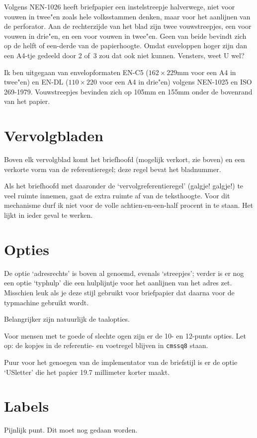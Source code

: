 \documentclass[a4paper,10pt]{artikel1}
\begin{document}
Volgens NEN-1026 heeft briefpapier een instelstreepje halverwege, niet
voor vouwen in twee"en zoals hele volksstammen denken, maar voor het
aanlijnen van de perforator.  Aan de rechterzijde van het blad zijn
twee vouwstreepjes, een voor vouwen in drie"en, en een voor vouwen in
twee"en.  Geen van beide bevindt zich op de helft of een-derde van de
papierhoogte. Omdat enveloppen hoger zijn dan een A4-tje gedeeld door
2 of~3 zou dat ook niet kunnen. Vensters, weet U wel?
 
Ik ben uitgegaan van envelopformaten EN-C5 ($162\times229$mm voor een
A4 in twee"en) en EN-DL ($110\times220$ voor een A4 in drie"en)
volgens NEN-1025 en ISO 269-1979.  Vouwstreepjes bevinden zich op
105mm en 155mm onder de bovenrand van het papier.
 
 
\section{Vervolgbladen}
 
Boven elk vervolgblad komt het briefhoofd (mogelijk verkort, zie
boven) en een verkorte vorm van de referentieregel; deze regel bevat
het bladnummer.
 
Als het briefhoofd met daaronder de `vervolgreferentieregel' (galgje!
galgje!) te veel ruimte innemen, gaat de extra ruimte af van de
teksthoogte. Voor dit mechanisme durf ik niet voor de volle
achtien-en-een-half procent in te staan.  Het lijkt in ieder geval te
werken.
 
 
\section{Opties}
 
De optie `adresrechts' is boven al genoemd, evenals `streepjes';
verder is er nog een optie `typhulp' die een hulplijntje voor het
aanlijnen van het adres zet. Misschien leuk als je deze stijl gebruikt
voor briefpapier dat daarna voor de typmachine gebruikt wordt.
 
Belangrijker zijn natuurlijk de taalopties.
 
Voor mensen met te goede of slechte ogen zijn er de 10- en 12-punts
opties. Let op: de kopjes in de referentie- en voetregel blijven in
\texttt{cmssq8} staan.
 
Puur voor het genoegen van de implementator van de briefstijl is er de
optie `USletter' die het papier 19.7 millimeter korter maakt.
 
\section{Labels}
 
Pijnlijk punt. Dit moet nog gedaan worden.
\end{document}
